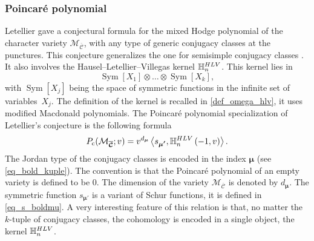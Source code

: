 \documentclass[11pt]{article}
\newcommand{\rc}{\mathrm{c}}
\newcommand{\HLV}{\textup{HLV}}
\theoremstyle{definition}
\theoremstyle{plain}
\DeclareMathOperator{\SymF}{Sym}
\newcommand{\mcbar}{\mathcal{M}_{\boldsymbol{\overline{\mathcal{C}}}}}
\begin{document}
\subsubsection{Poincaré polynomial}
Letellier \cite{Letellier13} gave a conjectural formula for the mixed Hodge polynomial of the character variety $\mathcal{M}_{\boldsymbol{\overline{\mathcal{C}}}}$, with any type of generic conjugacy classes at the punctures. This conjecture generalizes the one for semisimple conjugacy classes \cite{Hausel_Letellier_Villegas}. It also involves the Hausel--Letellier--Villegas kernel $\mathbb{H}_n^{\HLV}$. This kernel lies in
\[
\SymF\left[X_1\right]\otimes \dots \otimes \SymF\left[X_k\right],
\]
with $\SymF\left[X_j\right]$ being the space of symmetric functions in the infinite set of variables~$X_j$. The definition of the kernel is recalled in \ref{def_omega_hlv}, it uses modified Macdonald polynomials. The Poincaré polynomial specialization of Letellier's conjecture is the following formula
\begin{equation}\label{eq_poincare_intro}
P_{\rc}(\mcbar; v) = v^{d_{\boldsymbol{\mu}}} \left\langle s_{\boldsymbol{\mu'}}, \mathbb{H}_n^{\HLV}\left(-1,v\right)\right\rangle.
\end{equation}
The Jordan type of the conjugacy classes is encoded in the index $\boldsymbol{\mu}$ (see \eqref{eq_bold_kuple}). The convention is that the Poincaré polynomial of an empty variety is defined to be $0$. The dimension of the variety $\mcbar$ is denoted by $d_{\boldsymbol{\mu}}$. The symmetric function $s_{\boldsymbol{\mu'}}$ is a variant of Schur functions, it is defined in \eqref{eq_s_boldmu}. A very interesting feature of this relation is that, no matter the $k$-tuple of conjugacy classes, the cohomology is encoded in a single object, the kernel $\mathbb{H}_n^{\HLV}$.
\end{document}
